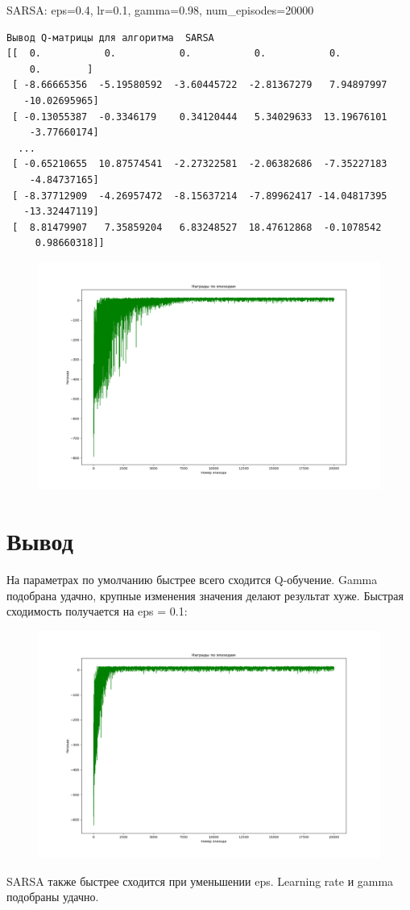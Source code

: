 \documentclass[a4paper]{article}
\begin{document}
  \noindent SARSA: eps=0.4, lr=0.1, gamma=0.98, num\_episodes=20000
  \begin{verbatim}
Вывод Q-матрицы для алгоритма  SARSA
[[  0.           0.           0.           0.           0.
    0.        ]
 [ -8.66665356  -5.19580592  -3.60445722  -2.81367279   7.94897997
   -10.02695965]
 [ -0.13055387  -0.3346179    0.34120444   5.34029633  13.19676101
    -3.77660174]
  ...
 [ -0.65210655  10.87574541  -2.27322581  -2.06382686  -7.35227183
    -4.84737165]
 [ -8.37712909  -4.26957472  -8.15637214  -7.89962417 -14.04817395
   -13.32447119]
 [  8.81479907   7.35859204   6.83248527  18.47612868  -0.1078542
     0.98660318]]
  \end{verbatim}
  \begin{figure}[H]
    \includegraphics[scale=0.35]{54}
  \end{figure}
  \pagebreak

  \section{Вывод}
  На параметрах по умолчанию быстрее всего сходится Q-обучение.
  Gamma подобрана удачно, крупные изменения значения делают результат хуже.
  Быстрая сходимость получается на eps = 0.1:
  \begin{figure}[H]
    \includegraphics[scale=0.35]{55}
  \end{figure}

  SARSA также быстрее сходится при уменьшении eps.
  Learning rate и gamma подобраны удачно.
\end{document}

